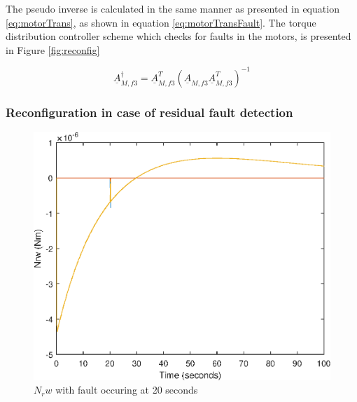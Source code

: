
The pseudo inverse is calculated in the same manner as presented in equation \ref{eq:motorTrans}, as shown in equation \ref{eq:motorTransFault}. The torque distribution controller scheme which checks for faults in the motors, is presented in Figure \ref{fig:reconfig}

\begin{equation}
\label{eq:motorTransFault}
\underline{A}_{M,f3}^\dagger   = \underline{A}_{M,f3}^T  (\underline{A}_{M,f3} \underline{A}_{M,f3}^T)^{-1}
\end{equation}
%

\subsubsection{Reconfiguration in case of residual fault detection}

\begin{figure}
	\centering
	\includegraphics[width=120mm]{figures/3dTorque_resid_reconfig}
	\caption{$N_rw$ with fault occuring at 20 seconds}
\end{figure} 

